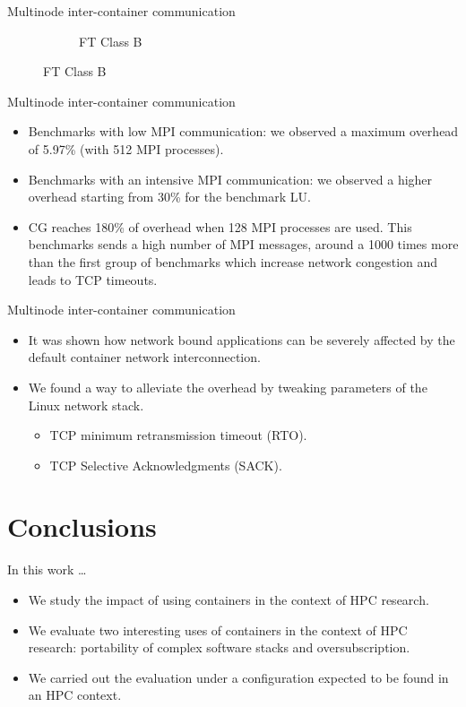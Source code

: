 \documentclass[presentation]{beamer}
\begin{document}
\begin{frame}[label=sec-3-7]{Multinode inter-container communication}
\begin{figure}
\begin{subfigure}[b]{0.42\textwidth}
    \caption{FT Class B}
  \end{subfigure}
\end{figure}
\end{frame}

\begin{frame}[label=sec-3-8]{Multinode inter-container communication}
\begin{itemize}
\item Benchmarks with low  MPI communication: we observed a maximum overhead of \alert{5.97\%} (with \alert{512 MPI processes}).
\item Benchmarks with an intensive MPI communication: we observed a higher overhead starting from \alert{30\%} for the benchmark LU.

\item CG reaches \alert{180\%} of overhead when \alert{128} MPI processes are used.
This benchmarks sends a high number of MPI messages, around
a 1000 times more than the first group of benchmarks
which increase network congestion and leads to TCP timeouts.
\end{itemize}
\end{frame}

\begin{frame}[label=sec-3-9]{Multinode inter-container communication}
\begin{itemize}
\item It was shown how network bound applications can be severely affected by
the default container network interconnection.

\item We found a way to alleviate the overhead
by tweaking parameters of the Linux network stack.

\begin{itemize}
\item TCP minimum retransmission timeout (RTO).
\item TCP Selective Acknowledgments (SACK).
\end{itemize}
\end{itemize}
\end{frame}


\section{Conclusions}
\label{sec-4}
\begin{frame}[label=sec-4-1]{In this work \ldots{}}
\begin{itemize}
\item We study the impact of using containers in the context of HPC research.

\item We evaluate two interesting uses of containers in the context of HPC research: portability of complex software stacks
and oversubscription.

\item We carried out the evaluation under a configuration expected to be found in an HPC context.
\end{itemize}
\end{frame}
\end{document}
